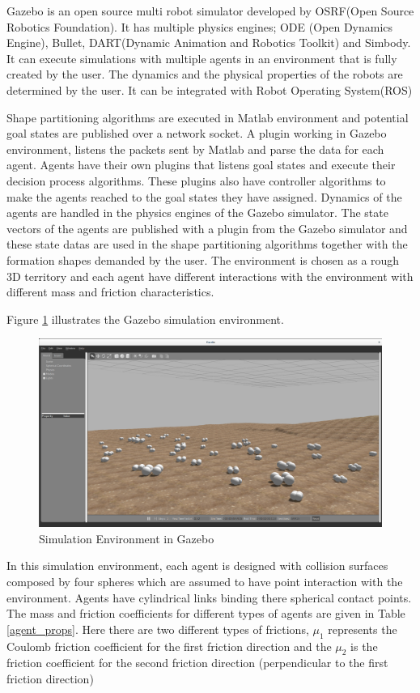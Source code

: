 Gazebo is an open source multi robot simulator developed by OSRF(Open Source Robotics Foundation). It has multiple physics engines; ODE (Open Dynamics Engine), Bullet, DART(Dynamic Animation and Robotics Toolkit) and Simbody. It can execute simulations with multiple agents in an environment that is fully created by the user. The dynamics and the physical properties of the robots are determined by the user. It can be integrated with Robot Operating System(ROS)

Shape partitioning algorithms are executed in Matlab environment and  potential goal states are published over a network socket. A plugin working in Gazebo environment, listens the packets sent by Matlab and parse the data for each agent. Agents have their own plugins that listens goal states and execute their decision process algorithms. These plugins also have controller algorithms to make the agents reached to the goal states they have assigned. Dynamics of the agents are handled in the physics engines of the Gazebo simulator. The state vectors of the agents are published with a plugin from the Gazebo simulator and these state datas are used in the shape partitioning algorithms together with the formation shapes demanded by the user.   The environment is chosen as a rough 3D territory and each agent have different interactions with the environment with different mass and friction characteristics.

Figure \ref{Gazebo} illustrates the Gazebo simulation environment. 

\begin{figure}[H]
\caption{Simulation Environment in Gazebo} \label{Gazebo}
\centerline{\includegraphics[scale = 0.22]{gazebo_env}}
\end{figure} 

In this simulation environment, each agent is designed with collision surfaces composed by four spheres which are assumed to have point interaction with the environment. Agents have 
cylindrical links binding there spherical contact points. The mass and friction coefficients for different types of agents are given in Table \ref{agent_props}. Here there are two different types of frictions, $\mu_1$ represents the Coulomb friction coefficient for the first friction direction and the $\mu_2$ is the friction coefficient for the second friction direction (perpendicular to the first friction direction)

